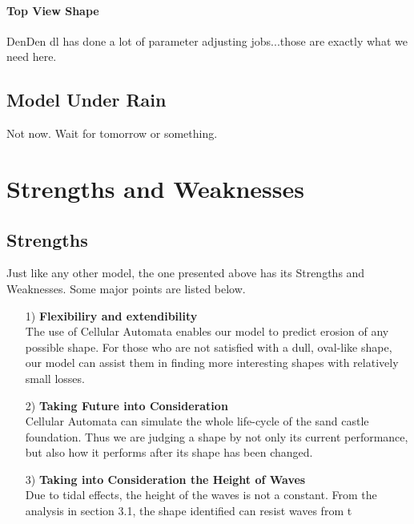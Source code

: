 \documentclass[12pt]{article}
\begin{document}
\paragraph{Top View Shape}
DenDen dl has done a lot of parameter adjusting jobs...those are exactly what we need here.
\subsection{Model Under Rain}
Not now. Wait for tomorrow or something.


\section{Strengths and Weaknesses}
\subsection{Strengths}
Just like any other model, the one presented above has its Strengths and Weaknesses. Some major points are listed below.
\begin{itemize}
    \item [1)]
          \textbf{Flexibiliry and extendibility}\\
          The use of Cellular Automata enables our model to predict erosion of any possible shape. For those who are not satisfied with a dull, oval-like shape, our model can assist them in finding more interesting shapes with relatively small losses.
    \item [2)]
          \textbf{Taking Future into Consideration}\\
          Cellular Automata can simulate the whole life-cycle of the sand castle foundation. Thus we are judging a shape by not only its current performance, but also how it performs after its shape has been changed.
    \item [3)]
          \textbf{Taking into Consideration the Height of Waves}\\
          Due to tidal effects, the height of the waves is not a constant. From the analysis in section 3.1, the shape identified can resist waves from t
\end{itemize}
\end{document}
